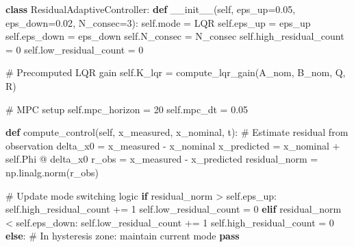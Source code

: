 \documentclass[
  letterpaper,
  DIV=11,
  numbers=noendperiod]{scrartcl}
\newenvironment{Shaded}{\begin{snugshade}}{\end{snugshade}}
\newcommand{\CommentTok}[1]{\textcolor[rgb]{0.37,0.37,0.37}{#1}}
\newcommand{\ControlFlowTok}[1]{\textcolor[rgb]{0.00,0.23,0.31}{\textbf{#1}}}
\newcommand{\DecValTok}[1]{\textcolor[rgb]{0.68,0.00,0.00}{#1}}
\newcommand{\FloatTok}[1]{\textcolor[rgb]{0.68,0.00,0.00}{#1}}
\newcommand{\FunctionTok}[1]{\textcolor[rgb]{0.28,0.35,0.67}{#1}}
\newcommand{\KeywordTok}[1]{\textcolor[rgb]{0.00,0.23,0.31}{\textbf{#1}}}
\newcommand{\NormalTok}[1]{\textcolor[rgb]{0.00,0.23,0.31}{#1}}
\newcommand{\OperatorTok}[1]{\textcolor[rgb]{0.37,0.37,0.37}{#1}}
\newcommand{\StringTok}[1]{\textcolor[rgb]{0.13,0.47,0.30}{#1}}
\newcommand{\VariableTok}[1]{\textcolor[rgb]{0.07,0.07,0.07}{#1}}
\begin{document}
\begin{Shaded}
\begin{Highlighting}[]
\KeywordTok{class}\NormalTok{ ResidualAdaptiveController:}
    \KeywordTok{def} \FunctionTok{\_\_init\_\_}\NormalTok{(}\VariableTok{self}\NormalTok{, eps\_up}\OperatorTok{=}\FloatTok{0.05}\NormalTok{, eps\_down}\OperatorTok{=}\FloatTok{0.02}\NormalTok{, N\_consec}\OperatorTok{=}\DecValTok{3}\NormalTok{):}
        \VariableTok{self}\NormalTok{.mode }\OperatorTok{=} \StringTok{\textquotesingle{}LQR\textquotesingle{}}
        \VariableTok{self}\NormalTok{.eps\_up }\OperatorTok{=}\NormalTok{ eps\_up}
        \VariableTok{self}\NormalTok{.eps\_down }\OperatorTok{=}\NormalTok{ eps\_down}
        \VariableTok{self}\NormalTok{.N\_consec }\OperatorTok{=}\NormalTok{ N\_consec}
        \VariableTok{self}\NormalTok{.high\_residual\_count }\OperatorTok{=} \DecValTok{0}
        \VariableTok{self}\NormalTok{.low\_residual\_count }\OperatorTok{=} \DecValTok{0}

        \CommentTok{\# Precomputed LQR gain}
        \VariableTok{self}\NormalTok{.K\_lqr }\OperatorTok{=}\NormalTok{ compute\_lqr\_gain(A\_nom, B\_nom, Q, R)}

        \CommentTok{\# MPC setup}
        \VariableTok{self}\NormalTok{.mpc\_horizon }\OperatorTok{=} \DecValTok{20}
        \VariableTok{self}\NormalTok{.mpc\_dt }\OperatorTok{=} \FloatTok{0.05}

    \KeywordTok{def}\NormalTok{ compute\_control(}\VariableTok{self}\NormalTok{, x\_measured, x\_nominal, t):}
        \CommentTok{\# Estimate residual from observation}
\NormalTok{        delta\_x0 }\OperatorTok{=}\NormalTok{ x\_measured }\OperatorTok{{-}}\NormalTok{ x\_nominal}
\NormalTok{        x\_predicted }\OperatorTok{=}\NormalTok{ x\_nominal }\OperatorTok{+} \VariableTok{self}\NormalTok{.Phi }\OperatorTok{@}\NormalTok{ delta\_x0}
\NormalTok{        r\_obs }\OperatorTok{=}\NormalTok{ x\_measured }\OperatorTok{{-}}\NormalTok{ x\_predicted}
\NormalTok{        residual\_norm }\OperatorTok{=}\NormalTok{ np.linalg.norm(r\_obs)}

        \CommentTok{\# Update mode switching logic}
        \ControlFlowTok{if}\NormalTok{ residual\_norm }\OperatorTok{\textgreater{}} \VariableTok{self}\NormalTok{.eps\_up:}
            \VariableTok{self}\NormalTok{.high\_residual\_count }\OperatorTok{+=} \DecValTok{1}
            \VariableTok{self}\NormalTok{.low\_residual\_count }\OperatorTok{=} \DecValTok{0}
        \ControlFlowTok{elif}\NormalTok{ residual\_norm }\OperatorTok{\textless{}} \VariableTok{self}\NormalTok{.eps\_down:}
            \VariableTok{self}\NormalTok{.low\_residual\_count }\OperatorTok{+=} \DecValTok{1}
            \VariableTok{self}\NormalTok{.high\_residual\_count }\OperatorTok{=} \DecValTok{0}
        \ControlFlowTok{else}\NormalTok{:}
            \CommentTok{\# In hysteresis zone: maintain current mode}
            \ControlFlowTok{pass}


\end{Highlighting}
\end{Shaded}
\end{document}
